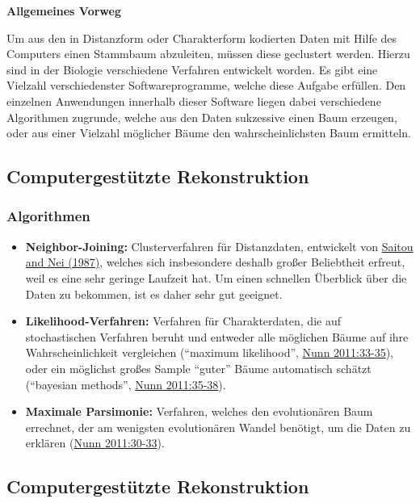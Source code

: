 \textbf{Allgemeines Vorweg}

Um aus den in Distanzform oder Charakterform kodierten Daten mit Hilfe
des Computers einen Stammbaum abzuleiten, müssen diese geclustert
werden. Hierzu sind in der Biologie verschiedene Verfahren entwickelt
worden. Es gibt eine Vielzahl verschiedenster Softwareprogramme, welche
diese Aufgabe erfüllen. Den einzelnen Anwendungen innerhalb dieser
Software liegen dabei verschiedene Algorithmen zugrunde, welche aus den
Daten sukzessive einen Baum erzeugen, oder aus einer Vielzahl möglicher
Bäume den wahrscheinlichsten Baum ermitteln.

\subsection{\texorpdfstring{{Computergestützte
Rekonstruktion}}{Computergestützte Rekonstruktion}}

\subsubsection{\texorpdfstring{{Algorithmen}}{Algorithmen}}

\begin{itemize}
\itemsep1pt\parskip0pt
\item
  \textbf{Neighbor-Joining:} Clusterverfahren für Distanzdaten,
  entwickelt von
  \href{http://bibliography.lingpy.org?key=Saitou1987}{Saitou and Nei
  (1987)}, welches sich insbesondere deshalb großer Beliebtheit erfreut,
  weil es eine sehr geringe Laufzeit hat. Um einen schnellen Überblick
  über die Daten zu bekommen, ist es daher sehr gut geeignet.
\item
  \textbf{Likelihood-Verfahren:} Verfahren für Charakterdaten, die auf
  stochastischen Verfahren beruht und entweder alle möglichen Bäume auf
  ihre Wahrscheinlichkeit vergleichen (``maximum likelihood'',
  \href{http://bibliography.lingpy.org?key=Nunn2011}{Nunn 2011:33-35}),
  oder ein möglichst großes Sample ``guter'' Bäume automatisch schätzt
  (``bayesian methods'',
  \href{http://bibliography.lingpy.org?key=Nunn2011}{Nunn 2011:35-38}).
\item
  \textbf{Maximale Parsimonie:} Verfahren, welches den evolutionären
  Baum errechnet, der am wenigsten evolutionären Wandel benötigt, um die
  Daten zu erklären
  (\href{http://bibliography.lingpy.org?key=Nunn2011}{Nunn 2011:30-33}).
\end{itemize}

\subsection{\texorpdfstring{{Computergestützte
Rekonstruktion}}{Computergestützte Rekonstruktion}}

